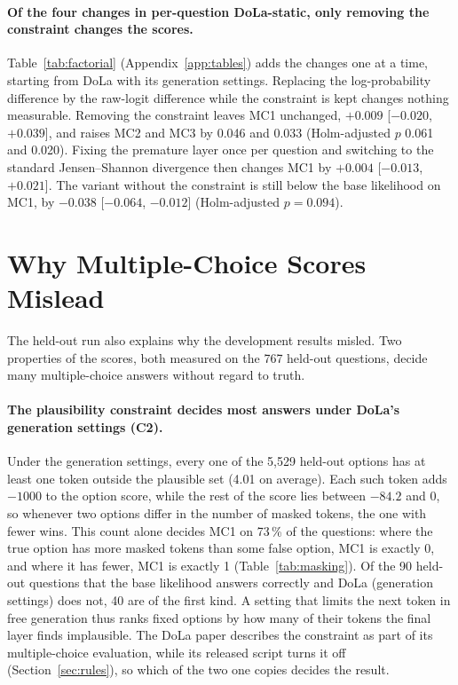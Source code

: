 \documentclass[11pt]{article}
\newcommand{\cha}[1]{\textsf{C#1}}
\newcommand{\method}{per-question DoLa-static}
\begin{document}
\paragraph{Of the four changes in \method{}, only removing the constraint changes the scores.}
Table~\ref{tab:factorial} (Appendix~\ref{app:tables}) adds the changes one at a time, starting from DoLa with its generation settings.
Replacing the log-probability difference by the raw-logit difference while the constraint is kept changes nothing
measurable. Removing the constraint leaves MC1 unchanged, $+0.009$ [$-0.020$, $+0.039$], and raises MC2 and MC3 by 0.046 and
0.033 (Holm-adjusted $p$ 0.061 and 0.020).
Fixing the premature layer once per question and switching to the standard Jensen--Shannon divergence then changes
MC1 by $+0.004$ [$-0.013$, $+0.021$]. The variant without the constraint is still below the base likelihood on
MC1, by $-0.038$ [$-0.064$, $-0.012$] (Holm-adjusted $p = 0.094$).

\section{Why Multiple-Choice Scores Mislead}
\label{sec:mislead}

The held-out run also explains why the development results misled. Two properties of the scores, both measured
on the 767 held-out questions, decide many multiple-choice answers without regard to truth.

\paragraph{The plausibility constraint decides most answers under DoLa's generation settings (\cha2).}
Under the generation settings, every one of the 5,529 held-out options has at least one token outside the plausible
set (4.01 on average). Each such token adds $-1000$ to the option score, while the rest of the score lies between
$-84.2$ and $0$, so whenever two options differ in the number of masked tokens, the one with fewer wins. This
count alone decides MC1 on 73\,\% of the questions: where the true option has more masked tokens than some false
option, MC1 is exactly 0, and where it has fewer, MC1 is exactly 1 (Table~\ref{tab:masking}). Of the 90 held-out
questions that the base likelihood answers correctly and DoLa (generation settings) does not, 40 are of the first
kind. A setting that limits the next token in free generation thus ranks fixed options by how many of their tokens
the final layer finds implausible. The DoLa paper describes the constraint as part of its multiple-choice
evaluation, while its released script turns it off (Section~\ref{sec:rules}), so which of the two one copies
decides the result.
\end{document}

